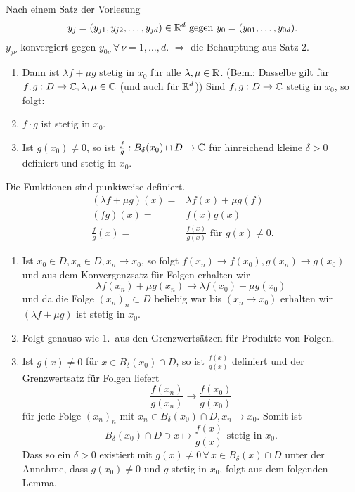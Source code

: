 \documentclass[../ana1.tex]{subfiles}
\begin{document}
\begin{bew}
    Nach einem Satz der Vorlesung
    \[ y_j = (y_{j1}, y_{j2}, \dots, y_{jd}) \in \mathbb{R}^d \text{ gegen } y_0  = (y_{01}, \dots,y_{0d}). \]
    \( y_{j\nu} \) konvergiert gegen \( y_{0\nu} \,\forall \, \nu = 1,\dots,d \).
    \( \Rightarrow \) die Behauptung aus Satz 2.
\end{bew}
\begin{satz}[Stetigkeitsregeln]
    \begin{enumerate}
        Seien \( f,g : D \rightarrow \R^d \) stetig in \( x_0 \in D \).
        \item Dann ist \( \lambda f + \mu g \) stetig in \( x_0 \) für alle 
        \( \lambda, \mu \in \mathbb{R} \).
        (Bem.: Dasselbe gilt für \( f,g:D\rightarrow \mathbb{C}, 
        \lambda, \mu \in \mathbb{C} \) (und auch für \( \mathbb{R}^d \)))
        Sind \( f,g: D\rightarrow \mathbb{C} \) stetig in \( x_0 \), so folgt:
        \item \( f \cdot g \) ist stetig in \( x_0 \).
        \item Ist \( g(x_0) \neq 0 \), so ist \( \frac{f}{g} : 
        B_\delta(x_0) \cap D \rightarrow \mathbb{C} \) für hinreichend kleine 
        \( \delta > 0 \) definiert und stetig in \( x_0 \).
    \end{enumerate}
\end{satz}
\begin{bew}
    Die Funktionen sind punktweise definiert.
    \begin{align*}
        (\lambda f + \mu g)(x) = &\lambda f(x) + \mu g(f) \\
        (f g)(x) = &f(x) g(x) \\
        \frac{f}{g}(x) = &\frac{f(x)}{g(x)} \text{ für } g(x) \neq 0.
    \end{align*}
    \begin{enumerate}
        \item Ist \( x_0 \in D, x_n \in D, x_n \rightarrow x_0 \), 
        so folgt \( f(x_n) \rightarrow f(x_0), g(x_n) \rightarrow g(x_0) \)
        und aus dem Konvergenzsatz für Folgen erhalten wir
        \[ \lambda f(x_n) + \mu g(x_n) \rightarrow 
        \lambda f(x_0) + \mu g(x_0) \]
        und da die Folge \( {(x_n)}_n \subset D \) beliebig war 
        bis \( (x_n \rightarrow x_0) \) erhalten wir 
        \( (\lambda f + \mu g) \) ist stetig in \( x_0 \).
        \item Folgt genauso wie 1.\ aus den Grenzwertsätzen 
        für Produkte von Folgen.
        \item Ist \( g(x) \neq 0 \) für \( x\in B_\delta(x_0) \cap D \),
        so ist \( \frac{f(x)}{g(x)} \) definiert und der Grenzwertsatz
        für Folgen liefert
        \[ \frac{f(x_n)}{g(x_n)} \rightarrow \frac{f(x_0)}{g(x_0)} \]
        für jede Folge \( {(x_n)}_n \) mit \( x_n \in B_\delta(x_0) 
        \cap D, x_n \rightarrow x_0 \). Somit ist 
        \[ B_\delta(x_0) \cap D \ni x \mapsto \frac{f(x)}{g(x)} 
        \text{ stetig in } x_0. \]
        Dass so ein \( \delta > 0 \) existiert mit \( g(x) \neq 0 
        \,\forall \, x \in B_\delta(x) \cap D \) unter der Annahme, 
        dass \( g(x_0) \neq 0 \) und \(g\) stetig in \( x_0 \), 
        folgt aus dem folgenden Lemma.
    \end{enumerate}
\end{bew}
\end{document}
